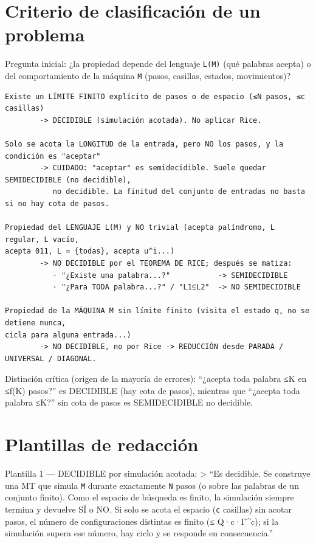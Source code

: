 \documentclass[12pt]{book} %
\begin{document}
\hypertarget{criterio-de-clasificaciuxf3n-de-un-problema}{%
\section{Criterio de clasificación de un
problema}\label{criterio-de-clasificaciuxf3n-de-un-problema}}

Pregunta inicial: ¿la propiedad depende del lenguaje \texttt{L(M)} (qué
palabras acepta) o del comportamiento de la máquina \texttt{M} (pasos,
casillas, estados, movimientos)?

\begin{verbatim}
Existe un LÍMITE FINITO explícito de pasos o de espacio (≤N pasos, ≤c casillas)
        -> DECIDIBLE (simulación acotada). No aplicar Rice.

Solo se acota la LONGITUD de la entrada, pero NO los pasos, y la condición es "aceptar"
        -> CUIDADO: "aceptar" es semidecidible. Suele quedar SEMIDECIDIBLE (no decidible),
           no decidible. La finitud del conjunto de entradas no basta si no hay cota de pasos.

Propiedad del LENGUAJE L(M) y NO trivial (acepta palíndromo, L regular, L vacío,
acepta 011, L = {todas}, acepta u^i...)
        -> NO DECIDIBLE por el TEOREMA DE RICE; después se matiza:
           · "¿Existe una palabra...?"           -> SEMIDECIDIBLE
           · "¿Para TODA palabra...?" / "L1⊆L2"  -> NO SEMIDECIDIBLE

Propiedad de la MÁQUINA M sin límite finito (visita el estado q, no se detiene nunca,
cicla para alguna entrada...)
        -> NO DECIDIBLE, no por Rice -> REDUCCIÓN desde PARADA / UNIVERSAL / DIAGONAL.
\end{verbatim}

Distinción crítica (origen de la mayoría de errores): ``¿acepta toda
palabra ≤K en ≤f(K) pasos?'' es DECIDIBLE (hay cota de pasos), mientras
que ``¿acepta toda palabra ≤K?'' sin cota de pasos es SEMIDECIDIBLE no
decidible.

\hypertarget{plantillas-de-redacciuxf3n}{%
\section{Plantillas de redacción}\label{plantillas-de-redacciuxf3n}}

Plantilla 1 --- DECIDIBLE por simulación acotada: \textgreater{} ``Es
decidible. Se construye una MT que simula \texttt{M} durante exactamente
\texttt{N} pasos (o sobre las palabras de un conjunto finito). Como el
espacio de búsqueda es finito, la simulación siempre termina y devuelve
SÍ o NO. Si solo se acota el espacio (\texttt{c} casillas) sin acotar
pasos, el número de configuraciones distintas es finito (≤
\textbar Q\textbar·c·\textbar Γ\textbar\^{}c); si la simulación supera
ese número, hay ciclo y se responde en consecuencia.''
\end{document}
